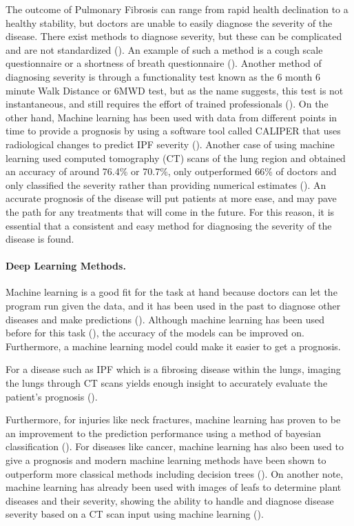 \documentclass[12pt]{article}
\begin{document}
The outcome of Pulmonary Fibrosis can range from rapid health declination to a healthy stability, but doctors are unable to easily diagnose the severity of the disease. 
There exist methods to diagnose severity, but these can be complicated and are not standardized (\cite{robbie2017evaluating}). 
An example of such a method is a cough scale questionnaire or a shortness of breath questionnaire (\cite{robbie2017evaluating,king2014phase,van2016cough}).
Another method of diagnosing severity is through a functionality test known as the 6 month 6 minute Walk Distance or 6MWD test, but as the name suggests, this test is not instantaneous, and still requires the effort of trained professionals (\cite{robbie2017evaluating,du20146}).
On the other hand, Machine learning has been used with data from different points in time to provide a prognosis by using a software tool called CALIPER that uses radiological changes to predict IPF severity (\cite{maldonado2014automated}).
Another case of using machine learning used computed tomography (CT) scans of the lung region and obtained an accuracy of around 76.4\% or 70.7\%, only outperformed 66\% of doctors and only classified the severity rather than providing numerical estimates (\cite{walsh2018deep}).
An accurate prognosis of the disease will put patients at more ease, and may pave the path for any treatments that will come in the future. 
For this reason, it is essential that a consistent and easy method for diagnosing the severity of the disease is found.

\paragraph*{Deep Learning Methods.}

Machine learning is a good fit for the task at hand because doctors can let the program run given the data, and it has been used in the past to diagnose other diseases and make predictions (\cite{wang2010high}). 
Although machine learning has been used before for this task (\cite{robbie2017evaluating,du20146,maldonado2014automated}), the accuracy of the models can be improved on.
Furthermore, a machine learning model could make it easier to get a prognosis.

For a disease such as IPF which is a fibrosing disease within the lungs, imaging the lungs through CT scans yields enough insight to accurately evaluate the patient's prognosis (\cite{walsh2018role}).

Furthermore, for injuries like neck fractures, machine learning has proven to be an improvement to the prediction performance using a method of bayesian classification (\cite{kukar1996machine}).
For diseases like cancer, machine learning has also been used to give a prognosis and modern machine learning methods have been shown to outperform more classical methods including decision trees (\cite{cruz2006applications}).
On another note, machine learning has already been used with images of leafs to determine plant diseases and their severity, showing the ability to handle and diagnose disease severity based on a CT scan input using machine learning (\cite{mwebaze2016machine}).
\end{document}
